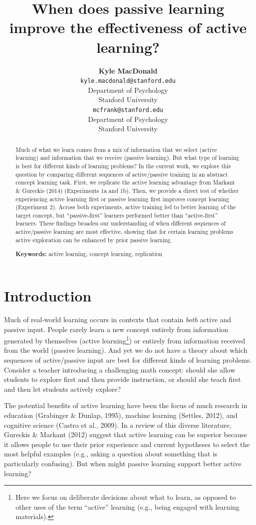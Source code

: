 \documentclass[10pt, letterpaper]{article}
\title{When does passive learning improve the effectiveness of active learning?}
\author{{\large \bf Kyle MacDonald} \\ \texttt{kyle.macdonald@stanford.edu} \\ Department of   Psychology \\ Stanford University
    \And {\large \bf Michael C. Frank} \\ \texttt{mcfrank@stanford.edu} \\ Department of Psychology \\ Stanford University}
\begin{document}
\maketitle

\begin{abstract}
Much of what we learn comes from a mix of information that we select
(active learning) and information that we receive (passive learning).
But what type of learning is best for different kinds of learning
problems? In the current work, we explore this question by comparing
different sequences of active/passive training in an abstract concept
learning task. First, we replicate the active learning advantage from
Markant \& Gureckis (2014) (Experiments 1a and 1b). Then, we provide a
direct test of whether experiencing active learning first or passive
learning first improves concept learning (Experiment 2). Across both
experiments, active training led to better learning of the target
concept, but ``passive-first'' learners performed better than
``active-first'' learners. These findings broaden our understanding of
when different sequences of active/passive learning are most effective,
showing that for certain learning problems active exploration can be
enhanced by prior passive learning.

\textbf{Keywords:}
active learning, concept learning, replication
\end{abstract}

\section{Introduction}\label{introduction}

Much of real-world learning occurs in contexts that contain \emph{both}
active and passive input. People rarely learn a new concept entirely
from information generated by themselves (active learning\footnote{Here
  we focus on deliberate decisions about what to learn, as opposed to
  other uses of the term ``active'' learning (e.g., being engaged with
  learning materials).}) or entirely from information received from the
world (passive learning). And yet we do not have a theory about which
sequences of active/passive input are best for different kinds of
learning problems. Consider a teacher introducing a challenging math
concept: should she allow students to explore first and then provide
instruction, or should she teach first and then let students actively
explore?

The potential benefits of active learning have been the focus of much
research in education (Grabinger \& Dunlap, 1995), machine learning
(Settles, 2012), and cognitive science (Castro et al., 2009). In a
review of this diverse literature, Gureckis \& Markant (2012) suggest
that active learning can be superior because it allows people to use
their prior experience and current hypotheses to select the most helpful
examples (e.g., asking a question about something that is particularly
confusing). But when might passive learning support better active
learning?
\end{document}
